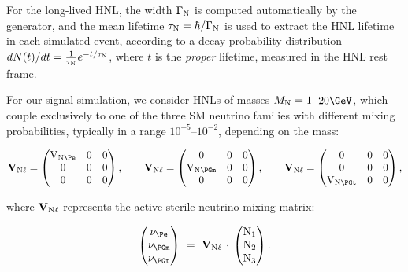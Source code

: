 For the long-lived HNL, the width $\Gamma_{\mathrm{N}}$ is computed automatically by the
generator, and the mean lifetime $\tau_{\mathrm{N}} = \hbar/\Gamma_{\mathrm{N}}$
is used to extract the HNL lifetime in each simulated event,
according to a decay probability distribution
$dN(t)/dt = \frac{1}{\tau_{\mathrm{N}}}e^{-t/\tau_{\mathrm{N}}}$, where $t$ is the
\emph{proper} lifetime, measured in the HNL rest frame.

For our signal simulation, we consider HNLs of masses
$M_{\mathrm{N}} = 1$--$20\GeV$, which couple
exclusively to one of the three SM neutrino families with different
mixing probabilities, typically in a range $10^{-5}$--$10^{-2}$,
depending on the mass:
\begin{linenomath}
\begin{equation}
  \mathbf{V}_{\hnl\ell} =
  \begin{pmatrix}
    \mathrm{V}_{\hnl\Pe} & 0 & 0 \\
    0                   & 0 & 0 \\
    0                   & 0 & 0 \\
  \end{pmatrix},
\quad\quad
  \mathbf{V}_{\hnl\ell} =
  \begin{pmatrix}
    0                    & 0 & 0 \\
    \mathrm{V}_{\hnl\PGm} & 0 & 0 \\
    0                    & 0 & 0 \\
  \end{pmatrix},
\quad\quad
  \mathbf{V}_{\hnl\ell} = 
  \begin{pmatrix}
    0                    & 0 & 0 \\
    0                    & 0 & 0 \\
    \mathrm{V}_{\hnl\PGt} & 0 & 0 \\
  \end{pmatrix},
\end{equation}
\end{linenomath}
where $\mathbf{V}_{\mathrm{N}\ell}$ represents the active-sterile neutrino
mixing matrix:
\begin{linenomath}
\begin{equation}
  \begin{pmatrix}
    \nu_{\Pe}  \\
    \nu_{\PGm} \\
    \nu_{\PGt} \\
  \end{pmatrix} ~=~
  \mathbf{V}_{\hnl\ell}\,\cdot\,
  \begin{pmatrix}
    \hnl_{1} \\
    \hnl_{2} \\
    \hnl_{3} \\
  \end{pmatrix}.
\end{equation}
\end{linenomath}




